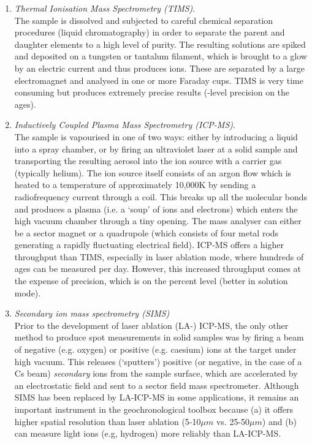 \documentclass{book}
\begin{document}
\begin{enumerate}
\item{\emph{Thermal Ionisation Mass Spectrometry (TIMS)}.}\\ The
  sample is dissolved and subjected to careful chemical separation
  procedures (liquid chromatography) in order to separate the parent
  and daughter elements to a high level of purity. The resulting
  solutions are spiked and deposited on a tungsten or tantalum
  filament, which is brought to a glow by an electric current and thus
  produces ions. These are separated by a large electromagnet and
  analysed in one or more Faraday cups. TIMS is very time consuming
  but produces extremely precise results (\permil-level precision on
  the ages).
 
\item{\emph{Inductively Coupled Plasma Mass Spectrometry
    (ICP-MS)}.}\\ The sample is vapourised in one of two ways: either
  by introducing a liquid into a spray chamber, or by firing an
  ultraviolet laser at a solid sample and transporting the resulting
  aerosol into the ion source with a carrier gas (typically
  helium). The ion source itself consists of an argon flow which is
  heated to a temperature of approximately 10,000K by sending a
  radiofrequency current through a coil. This breaks up all the
  molecular bonds and produces a plasma (i.e. a `soup' of ions and
  electrons) which enters the high vacuum chamber through a tiny
  opening.  The mass analyser can either be a sector magnet or a
  quadrupole (which consists of four metal rods generating a rapidly
  fluctuating electrical field). ICP-MS offers a higher throughput
  than TIMS, especially in laser ablation mode, where hundreds of ages
  can be measured per day. However, this increased throughput comes at
  the expense of precision, which is on the percent level (better in
  solution mode).

\item{\emph{Secondary ion mass spectrometry (SIMS)}}\\ Prior to the
  development of laser ablation (LA-) ICP-MS, the only other method to
  produce spot measurements in solid samples was by firing a beam of
  negative (e.g. oxygen) or positive (e.g. caesium) ions at the target
  under high vacuum.  This releases (`sputters') positive (or
  negative, in the case of a Cs beam) \emph{secondary} ions from the
  sample surface, which are accelerated by an electrostatic field and
  sent to a sector field mass spectrometer. Although SIMS has been
  replaced by LA-ICP-MS in some applications, it remains an important
  instrument in the geochronological toolbox because (a) it offers
  higher spatial resolution than laser ablation (5-10$\mu m$
  vs. 25-50$\mu m$) and (b) can measure light ions (e.g, hydrogen)
  more reliably than LA-ICP-MS.


\end{enumerate}
\end{document}
